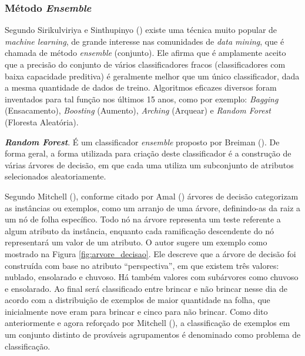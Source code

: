 \subsubsection{Método \textit{Ensemble}}
\label{ensemble}
Segundo Sirikulviriya e Sinthupinyo (\citeyear{SirikulviriyaIntegrationOR}) existe uma técnica muito popular de \textit{machine learning}, de grande interesse nas comunidades de \textit{data mining}, que é chamada de método \textit{ensemble} (conjunto). Ele afirma que é amplamente aceito que a precisão do conjunto de vários classificadores fracos (classificadores com baixa capacidade preditiva) é geralmente melhor que um único classificador, dada a mesma quantidade de dados de treino. Algoritmos eficazes diversos foram inventados para tal função nos últimos 15 anos, como por exemplo: \textit{Bagging} (Ensacamento), \textit{Boosting} (Aumento), \textit{Arching} (Arquear) e \textit{Random Forest} (Floresta Aleatória).

\textbf{\textit{Random Forest}}. É um classificador \textit{ensemble} proposto por Breiman (\citeyear{Breiman:2001:RF:570181.570182}). De forma geral, a forma utilizada para criação deste classificador é a construção de várias árvores de decisão, em que cada uma utiliza um subconjunto de atributos selecionados aleatoriamente.

Segundo Mitchell (\citeyear{Mitchell:1997:ML:541177}), conforme citado por Amal (\citeyear{Amal}) árvores de decisão categorizam as instâncias ou exemplos, como um arranjo de uma árvore, definindo-as da raiz a um nó de folha específico. Todo nó na árvore representa um teste referente a algum atributo da instância, enquanto cada ramificação descendente do nó representará um valor de um atributo. O autor sugere um exemplo como mostrado na Figura \ref{fig:arvore_decisao}. Ele descreve que a árvore de decisão foi construída com base no atributo “perspectiva”, em que existem três valores: nublado, ensolarado e chuvoso. Há também valores com subárvores como chuvoso e ensolarado. Ao final será classificado entre brincar e não brincar nesse dia de acordo com a distribuição de exemplos de maior quantidade na folha, que inicialmente nove eram para brincar e cinco para não brincar. Como dito anteriormente e agora reforçado por Mitchell (\citeyear{Mitchell:1997:ML:541177}), a classificação de exemplos em um conjunto distinto de prováveis agrupamentos é denominado como problema de classificação.

